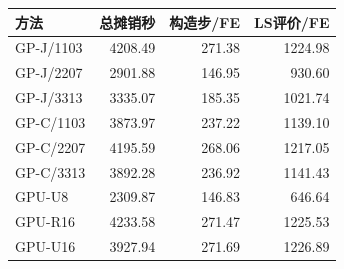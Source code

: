 \begin{tabular}{@{}lrrr@{}}
\toprule
方法 & 总摊销秒 & 构造步/FE & LS评价/FE \\ \midrule
GP-J/1103 & 4208.49 & 271.38 & 1224.98 \\
GP-J/2207 & 2901.88 & 146.95 & 930.60 \\
GP-J/3313 & 3335.07 & 185.35 & 1021.74 \\
GP-C/1103 & 3873.97 & 237.22 & 1139.10 \\
GP-C/2207 & 4195.59 & 268.06 & 1217.05 \\
GP-C/3313 & 3892.28 & 236.92 & 1141.43 \\
GPU-U8 & 2309.87 & 146.83 & 646.64 \\
GPU-R16 & 4233.58 & 271.47 & 1225.53 \\
GPU-U16 & 3927.94 & 271.69 & 1226.89 \\
\bottomrule
\end{tabular}
